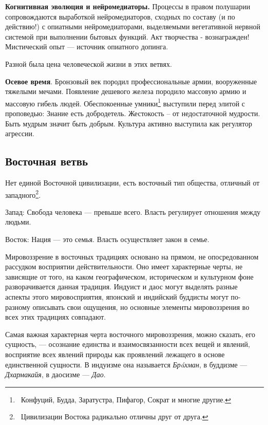\documentclass[a4paper]{article}
\begin{document}
{
\textbf{Когнитивная эволюция и нейромедиаторы.} Процессы в правом полушарии сопровождаются выработкой нейромедиаторов,
сходных по составу (и по действию!) с опиатными нейромедиаторами, выделяемыми вегетативной нервной системой при
выполнении {\textquotedbl}бытовых{\textquotedbl} функций. Акт творчества - вознагражден! Мистический опыт — источник
опиатного допинга. }

{
Разной была цена человеческой жизни в этих ветвях. }

{
\textbf{Осевое время}. Бронзовый век породил профессиональные армии, вооруженные тяжелыми мечами. Появление дешевого
железа породило массовую армию и массовую гибель людей. Обеспокоенные
{\textquotedbl}умники{\textquotedbl}\footnote{\foreignlanguage{russian}{\ Конфуций, Будда, Заратустра, Пифагор, Сократ
и многие другие.}} выступили перед элитой с проповедью: {\textquotedbl}Знание есть добродетель. Жестокость – от
недостаточной мудрости. Быть мудрым значит быть добрым{\textquotedbl}. Культура активно выступила как регулятор
агрессии. }

\subsection[Восточная ветвь ]{ Восточная ветвь }
{
Нет единой Восточной цивилизации, есть восточный тип общества, отличный от
западного\footnote{\foreignlanguage{russian}{\ Цивилизации Востока радикально отличны друг от друга.}}. }

{
Запад: {\textquotedbl}Свобода человека — превыше всего{\textquotedbl}. Власть регулирует отношения между людьми.}

{
Восток: {\textquotedbl}Нация — это семья{\textquotedbl}. Власть осуществляет закон в семье.}

{
Мировоззрение в восточных традициях основано на прямом, не опосредованном рассудком восприятии действительности. Оно
имеет характерные черты, не зависящие от того, на каком географическом, историческом и культурном фоне разворачивается
данная традиция. Индуист и даос могут выделять разные аспекты этого мировосприятия, японский и индийский буддисты могут
по-разному описывать свои ощущения, но основные элементы мировоззрения во всех этих традициях совпадают.}

{
Самая важная характерная черта восточного мировоззрения, можно сказать, его сущность, — осознание единства и
взаимосвязанности всех вещей и явлений, восприятие всех явлений природы как проявлений лежащего в основе единственной
сущности. В индуизме она называется \textit{Брáхман}, в буддизме — \textit{Дхармакайя}, в даосизме — \textit{Дао}. }
\end{document}
